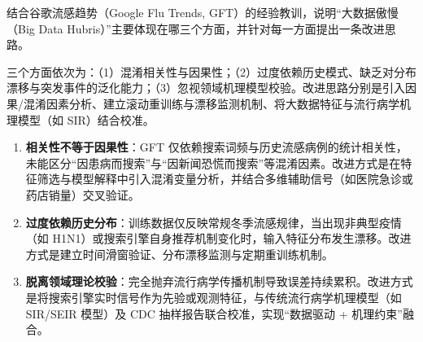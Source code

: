 \begin{exercise}[title={大数据傲慢与 GFT 反思},level=basic,points=10,tags={大数据傲慢,GFT,因果推断}]
结合谷歌流感趋势（Google Flu Trends, GFT）的经验教训，说明“大数据傲慢（Big Data Hubris）”主要体现在哪三个方面，并针对每一方面提出一条改进思路。
\begin{answer}
三个方面依次为：（1）混淆相关性与因果性；（2）过度依赖历史模式、缺乏对分布漂移与突发事件的泛化能力；（3）忽视领域机理模型校验。改进思路分别是引入因果/混淆因素分析、建立滚动重训练与漂移监测机制、将大数据特征与流行病学机理模型（如 SIR）结合校准。
\end{answer}
\begin{solution}
\begin{enumerate}
  \item \textbf{相关性不等于因果性}：GFT 仅依赖搜索词频与历史流感病例的统计相关性，未能区分“因患病而搜索”与“因新闻恐慌而搜索”等混淆因素。改进方式是在特征筛选与模型解释中引入混淆变量分析，并结合多维辅助信号（如医院急诊或药店销量）交叉验证。
  \item \textbf{过度依赖历史分布}：训练数据仅反映常规冬季流感规律，当出现非典型疫情（如 H1N1）或搜索引擎自身推荐机制变化时，输入特征分布发生漂移。改进方式是建立时间滑窗验证、分布漂移监测与定期重训练机制。
  \item \textbf{脱离领域理论校验}：完全抛弃流行病学传播机制导致误差持续累积。改进方式是将搜索引擎实时信号作为先验或观测特征，与传统流行病学机理模型（如 SIR/SEIR 模型）及 CDC 抽样报告联合校准，实现“数据驱动 + 机理约束”融合。
\end{enumerate}
\end{solution}
\end{exercise}

